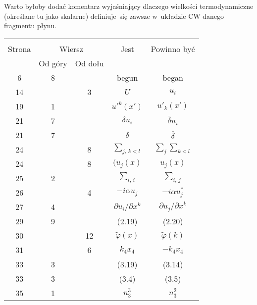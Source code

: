 \documentclass[a4paper,11pt]{article}
\begin{document}
 Warto byłoby dodać komentarz wyjaśniający dlaczego
wielkości termodynamiczne (określane tu jako skalarne) definiuje~się
zawsze w~układzie CW danego fragmentu płynu.

\vspace{\spaceFour}










\begin{center}

  \begin{tabular}{|c|c|c|c|c|}
    \hline
    & \multicolumn{2}{c|}{} & & \\
    Strona & \multicolumn{2}{c|}{Wiersz} & Jest
                              & Powinno być \\ \cline{2-3}
    & Od góry & Od dołu & & \\
    \hline
    6 & 8 & & begun & began \\
    14 & & 3 & $U$ & $u_{ i }$ \\
    19 & 1 & & $u'^{ k }( x' )$ & $u'_{ k }( x' )$ \\
    21 & 7 & & $\delta u_{ i }$ & $\overline{ \delta } u_{ i }$ \\
    21 & 7 & & $\delta$ & $\overline{ \delta }$ \\
    24 & & 8 & $\sum\limits_{ j,\, k < l }$
           & $\sum\limits_{ j } \sum\limits_{ k < l }$ \\
    24 & & 8 & $( u_{ j }( x )$ & $u_{ j }( x )$ \\
    25 & 2 & & $\sum\limits_{ i,\, i }$ & $\sum\limits_{ i,\, j }$ \\
    26 & & 4 & $-i \alpha u_{ j }$ & $-i \alpha u_{ j }^{ * }$ \\
    27 & 4 & & $\partial u_{ i } / \partial x^{ k }$
           & $\partial u_{ j } / \partial x^{ k }$ \\
    29 & 9 & & (2.19) & (2.20) \\
    30 & & 12 & $\tilde{ \varphi }( x )$ & $\tilde{ \varphi }( k )$ \\
    31 & & 6 & $k_{ 4 } x_{ 4 }$ & $-k_{ 4 } x_{ 4 }$ \\
    33 & 3 & & (3.19) & (3.14) \\
    33 & 3 & & (3.4) & (3.5) \\
    35 & 1 & & $n_{ 3 }^{ 3 }$ & $n_{ 3 }^{ 2 }$ \\

\end{tabular}
\end{center}
\end{document}
